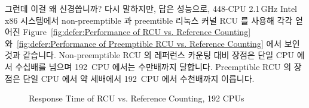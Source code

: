 그런데 이걸 왜 신경씁니까?
다시 말하지만, 답은 성능으로, 448-CPU 2.1\,GHz Intel x86 시스템에서
non-preemptible 과 preemtible 리눅스 커널 RCU 를 사용해 각각 얻어진
Figure~\ref{fig:defer:Performance of RCU vs. Reference Counting}
와~\ref{fig:defer:Performance of Preemptible RCU vs. Reference Counting}
에서 보인 것과 같습니다.
Non-preemptible RCU 의 레퍼런스 카운팅 대비 장점은 단일 CPU 에서 수십배를
넘으며 192~CPU 에서는 수만배까지 달합니다.
Preemptible RCU 의 장점은 단일 CPU 에서 약 세배에서 192~CPU 에서 수천배까지
이릅니다.

\begin{figure}[tb]
\centering
{}
\caption{Response Time of RCU vs. Reference Counting, 192 CPUs}
\label{fig:defer:Response Time of RCU vs. Reference Counting}
\end{figure}

